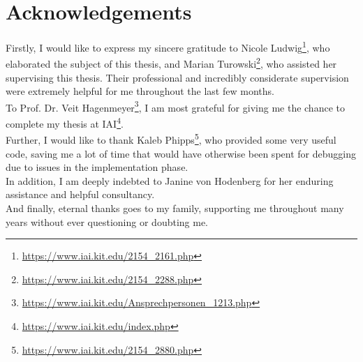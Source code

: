 \chapter*{Acknowledgements}

Firstly, I would like to express my sincere gratitude to Nicole Ludwig\footnote{\url{https://www.iai.kit.edu/2154_2161.php}}, who elaborated the subject of this thesis, and Marian Turowski\footnote{\url{https://www.iai.kit.edu/2154_2288.php}}, who assisted her supervising this thesis. Their professional and incredibly considerate supervision were extremely helpful for me throughout the last few months.\\

To Prof. Dr. Veit Hagenmeyer\footnote{\url{https://www.iai.kit.edu/Ansprechpersonen_1213.php}}, I am most grateful for giving me the chance to complete my thesis at IAI\footnote{\url{https://www.iai.kit.edu/index.php}}.\\

Further, I would like to thank Kaleb Phipps\footnote{\url{https://www.iai.kit.edu/2154_2880.php}}, who provided some very useful code, saving me a lot of time that would have otherwise been spent for debugging due to issues in the implementation phase.\\

In addition, I am deeply indebted to Janine von Hodenberg for her enduring assistance and helpful consultancy.\\

And finally, eternal thanks goes to my family, supporting me throughout many years without ever questioning or doubting me.\\

